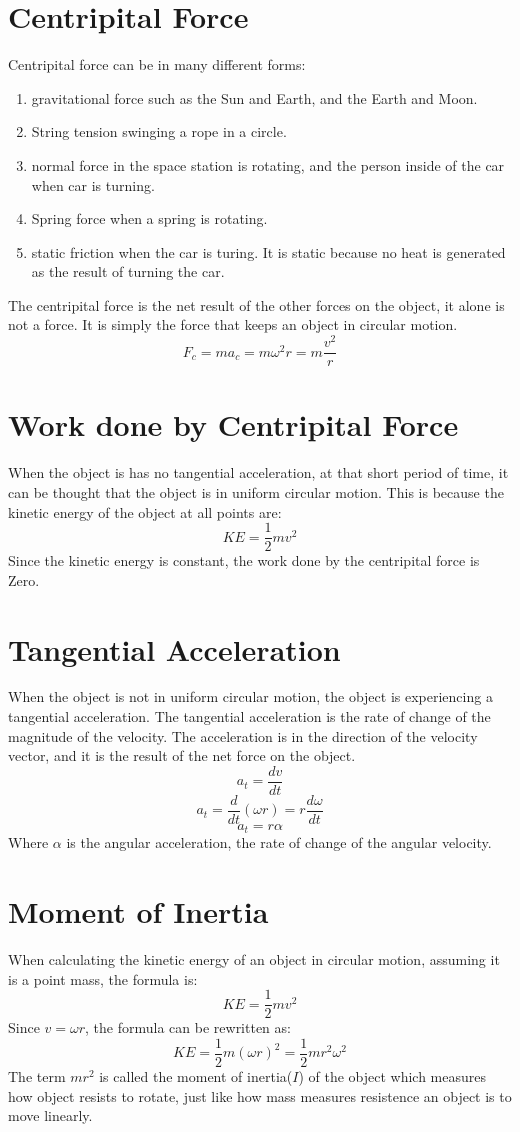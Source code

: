\documentclass[]{article}
\begin{document}
    \section{Centripital Force}\label{sec:centripital-force}
    Centripital force can be in many different forms:
    \begin {enumerate}
        \item gravitational force such as the Sun and Earth, and the Earth
        and Moon.
        \item String tension swinging a rope in a circle.
        \item normal force in the space station is rotating, and the person
        inside of the car when car is turning.
        \item Spring force when a spring is rotating.
        \item static friction when the car is turing. It is static because no
        heat is generated as the result of turning the car.
    \end{enumerate}
    The centripital force is the net result of the other forces on the object,
    it alone is not a force. It is simply the force that keeps an
    object in circular motion.
    \[F_c = m a_c = m \omega ^2 r = m\frac{v^2}{r}\]

    \section{Work done by Centripital Force}
        When the object is has no tangential acceleration, at that short
        period of time, it can be thought that the object is in uniform
        circular motion.
        This is because the kinetic energy of the object at all points are:
            \[KE = \frac{1}{2} m v^2\]
        Since the kinetic energy is constant, the work done by the
        centripital force is Zero.
    \section{Tangential Acceleration}
        When the object is not in uniform circular motion, the object is
        experiencing a tangential acceleration. The tangential acceleration
        is the rate of change of the magnitude of the velocity. The
        acceleration is in the direction of the velocity vector, and it is
        the result of the net force on the object.
        \[a_t = \frac{dv}{dt}\]
        \[a_t = \frac{d}{dt}(\omega r) = r \frac{d\omega}{dt}\]
        \[a_t = r \alpha\]
        Where $\alpha$ is the angular acceleration, the rate of change of the
        angular velocity.
    \section{Moment of Inertia}
    When calculating the kinetic energy of an object in circular motion,
    assuming it is a point mass, the formula is:
        \[KE = \frac{1}{2}mv^2\]
    Since $v = \omega r$, the formula can be rewritten as:
        \[KE = \frac{1}{2}m(\omega r)^2 = \frac{1}{2}m r^2 \omega^2\]
    The term $mr^2$ is called the moment of inertia($I$) of the object which
    measures how object resists to rotate, just like how mass measures
    resistence an object is to move linearly.
\end{document}
